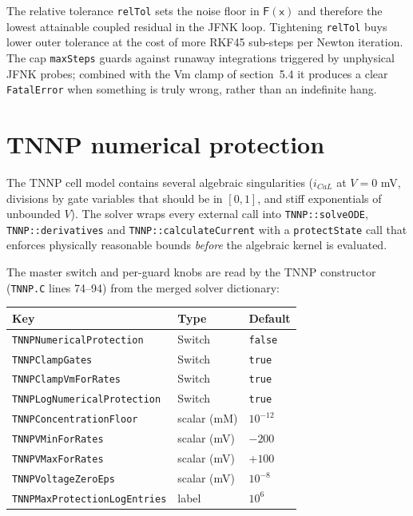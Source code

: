 \documentclass[11pt,a4paper]{article}
\newcommand{\code}[1]{\texttt{\small #1}}
\begin{document}
The relative tolerance \code{relTol} sets the noise floor in
$\mathsf{F}(\mathsf{x})$ and therefore the lowest attainable coupled
residual in the JFNK loop. Tightening \code{relTol} buys lower outer
tolerance at the cost of more RKF45 sub-steps per Newton iteration.
The cap \code{maxSteps} guards against runaway integrations triggered
by unphysical JFNK probes; combined with the Vm clamp of
section~5.4 it produces a clear \code{FatalError} when something is
truly wrong, rather than an indefinite hang.

\section{TNNP numerical protection}

The TNNP cell model contains several algebraic singularities
($i_{CaL}$ at $V = 0$ mV, divisions by gate variables that should be in
$[0,1]$, and stiff exponentials of unbounded $V$). The solver wraps
every external call into \code{TNNP::solveODE},
\code{TNNP::derivatives} and \code{TNNP::calculateCurrent} with a
\code{protectState} call that enforces physically reasonable bounds
\emph{before} the algebraic kernel is evaluated.

The master switch and per-guard knobs are read by the TNNP constructor
(\code{TNNP.C} lines 74--94) from the merged solver dictionary:

\begin{center}
\begin{tabular}{@{}lll@{}}
\toprule
Key & Type & Default \\
\midrule
\code{TNNPNumericalProtection} & Switch & \code{false} \\
\code{TNNPClampGates} & Switch & \code{true} \\
\code{TNNPClampVmForRates} & Switch & \code{true} \\
\code{TNNPLogNumericalProtection} & Switch & \code{true} \\
\code{TNNPConcentrationFloor} & scalar (mM) & $10^{-12}$ \\
\code{TNNPVMinForRates} & scalar (mV) & $-200$ \\
\code{TNNPVMaxForRates} & scalar (mV) & $+100$ \\
\code{TNNPVoltageZeroEps} & scalar (mV) & $10^{-8}$ \\
\code{TNNPMaxProtectionLogEntries} & label & $10^{6}$ \\
\bottomrule
\end{tabular}
\end{center}
\end{document}
